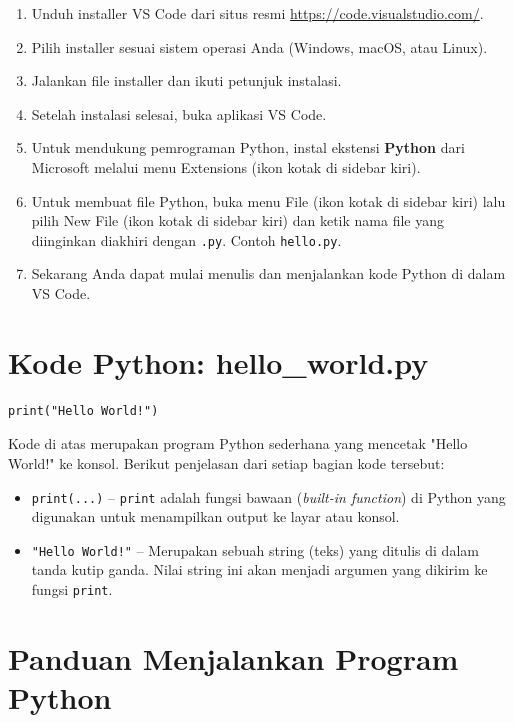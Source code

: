 \begin{enumerate}
    \item Unduh installer VS Code dari situs resmi \url{https://code.visualstudio.com/}.
    \item Pilih installer sesuai sistem operasi Anda (Windows, macOS, atau Linux).
    \item Jalankan file installer dan ikuti petunjuk instalasi.
    \item Setelah instalasi selesai, buka aplikasi VS Code.
    \item Untuk mendukung pemrograman Python, instal ekstensi \textbf{Python} dari Microsoft melalui menu Extensions (ikon kotak di sidebar kiri).
    \item Untuk membuat file Python, buka menu File (ikon kotak di sidebar kiri) lalu pilih New File (ikon kotak di sidebar kiri) dan ketik nama file yang diinginkan diakhiri dengan \texttt{.py}. Contoh \texttt{hello.py}.
    \item Sekarang Anda dapat mulai menulis dan menjalankan kode Python di dalam VS Code.
\end{enumerate}

\section{Kode Python: hello_world.py}\label{sec:hello_world_code}

\begin{lstlisting}[style=PythonStyle, caption={Kode Python: hello_world.py}]
print("Hello World!")
\end{lstlisting}

Kode di atas merupakan program Python sederhana yang mencetak "Hello World!" ke konsol. Berikut penjelasan dari setiap bagian kode tersebut:

\begin{itemize}
\item \texttt{print(...)} – \texttt{print} adalah fungsi bawaan (\textit{built-in function}) di Python yang digunakan untuk menampilkan output ke layar atau konsol.
\item \texttt{"Hello World!"} – Merupakan sebuah string (teks) yang ditulis di dalam tanda kutip ganda. Nilai string ini akan menjadi argumen yang dikirim ke fungsi \texttt{print}.
\end{itemize}

\section{Panduan Menjalankan Program Python}

